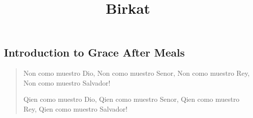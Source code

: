 ﻿\documentclass[a5paper, 12pt]{Birchon}
\title{Birkat}
\begin{document}
\begin{english}
\section*{Introduction to Grace After Meals}
\begin{verse}
Non como muestro Dio, Non como muestro Senor,
Non como muestro Rey, Non como muestro Salvador!

Qien como muestro Dio, Qien como muestro Senor,
Qien como muestro Rey, Qien como muestro Salvador!


\end{verse}
\end{english}

\eject

{}
{}

\eject
\end{document}
